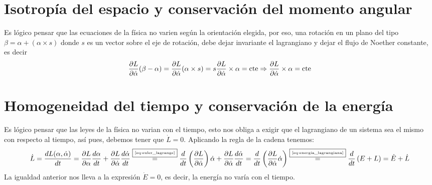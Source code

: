 \section{Isotropía del espacio y conservación del momento angular}
Es lógico pensar que las ecuaciones de la física no varien según la orientación elegida, por eso, una rotación en un plano del tipo $\beta=\alpha + (\alpha\times s)$ donde $s$ es un vector sobre el eje de rotación, debe dejar invariante el lagrangiano y dejar el flujo de Noether constante, es decir
\begin{equation}
    \label{eq:conservacion_momento_angular}
    \frac{\partial L}{\partial\dot{\alpha}}(\beta-\alpha) = \frac{\partial L}{\partial\dot{\alpha}}(\alpha\times s) = s \frac{\partial L}{\partial\dot{\alpha}}\times \alpha=\text{cte}\Rightarrow\frac{\partial L}{\partial\dot{\alpha}}\times \alpha=\text{cte}
\end{equation}

\section{Homogeneidad del tiempo y conservación de la energía}
Es lógico pensar que las leyes de la física no varian con el tiempo, esto nos obliga a exigir que el lagrangiano de un sistema sea el mismo con respecto al tiempo, así pues, debemos tener que $\dot{L}=0$.
Aplicando la regla de la cadena tenemos:
\begin{equation*}
    \dot{L}=\frac{dL(\alpha, \dot{\alpha})}{dt}=\frac{\partial L}{\partial \alpha}\frac{d\alpha}{dt}+\frac{\partial L}{\partial \dot{\alpha}}\frac{d\dot{\alpha}}{dt}\overset{\fbox{\tiny \ref{eq:euler_lagrange}}}{=}\frac{d}{dt}\left(\frac{\partial L}{\partial \dot{\alpha}}\right)\dot{\alpha}+\frac{\partial L}{\partial \dot{\alpha}}\frac{d\dot{\alpha}}{dt}=\frac{d}{dt}\left(\frac{\partial L}{\partial \dot{\alpha}}\dot{\alpha}\right)\overset{\fbox{\tiny \ref{eq:energia_lagrangiana}}}{=}\frac{d}{dt}\left(E+L\right)=\dot{E}+\dot{L}
\end{equation*}
La igualdad anterior nos lleva a la expresión $\dot{E}=0$, es decir, la energía no varía con el tiempo.
